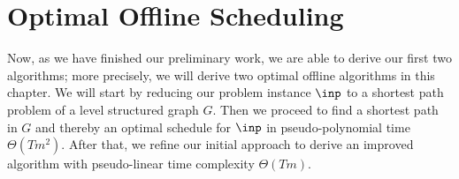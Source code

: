 
\chapter{Optimal Offline Scheduling}
Now, as we have finished our preliminary work, we are able to derive our first two algorithms; more precisely, we will derive two optimal offline algorithms in this chapter.
We will start by reducing our problem instance $\inp$ to a shortest path problem of a level structured graph $G$. Then we proceed to find a shortest path in $G$ and thereby an optimal schedule for $\inp$ in pseudo-polynomial time $\Theta(Tm^2)$.
After that, we refine our initial approach to derive an improved algorithm with pseudo-linear time complexity $\Theta(Tm)$.

